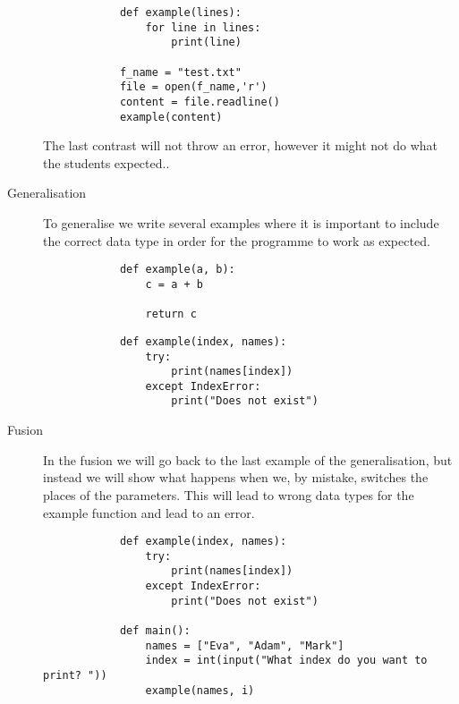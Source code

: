 \begin{description}
\hfill
    \begin{minipage}[t]{0.45\columnwidth}
        \begin{verbatim}
            def example(lines):
                for line in lines:
                    print(line)

            f_name = "test.txt"
            file = open(f_name,'r')
            content = file.readline()
            example(content)
        \end{verbatim}
    \end{minipage}
\hfill

The last contrast will not throw an error, however it might not do what 
the students expected.. 
    
    \item[Generalisation] To generalise we write several examples where it 
is important to include the correct data type in order for the 
programme to work as expected.


    \hfill
     \begin{minipage}[t]{0.45\columnwidth}
        \begin{verbatim}
            def example(a, b):
                c = a + b

                return c
        \end{verbatim}
    \end{minipage}
\hfill
 \hfill
    \begin{minipage}[t]{0.45\columnwidth}
        \begin{verbatim}
            def example(index, names):
                try:
                    print(names[index])
                except IndexError:
                    print("Does not exist")
        \end{verbatim}
    \end{minipage}
\hfill

    
    \item[Fusion] In the fusion we will go back to the last example of the 
generalisation, but instead we will show what happens when we, by 
mistake, switches the places of the parameters. This will lead to 
wrong data types for the example function and lead to an error. 
     \hfill
        \begin{verbatim}
            def example(index, names):
                try:
                    print(names[index])
                except IndexError:
                    print("Does not exist")

            def main():
                names = ["Eva", "Adam", "Mark"]
                index = int(input("What index do you want to print? "))
                example(names, i)
        \end{verbatim}
\hfill

    
\end{description}


